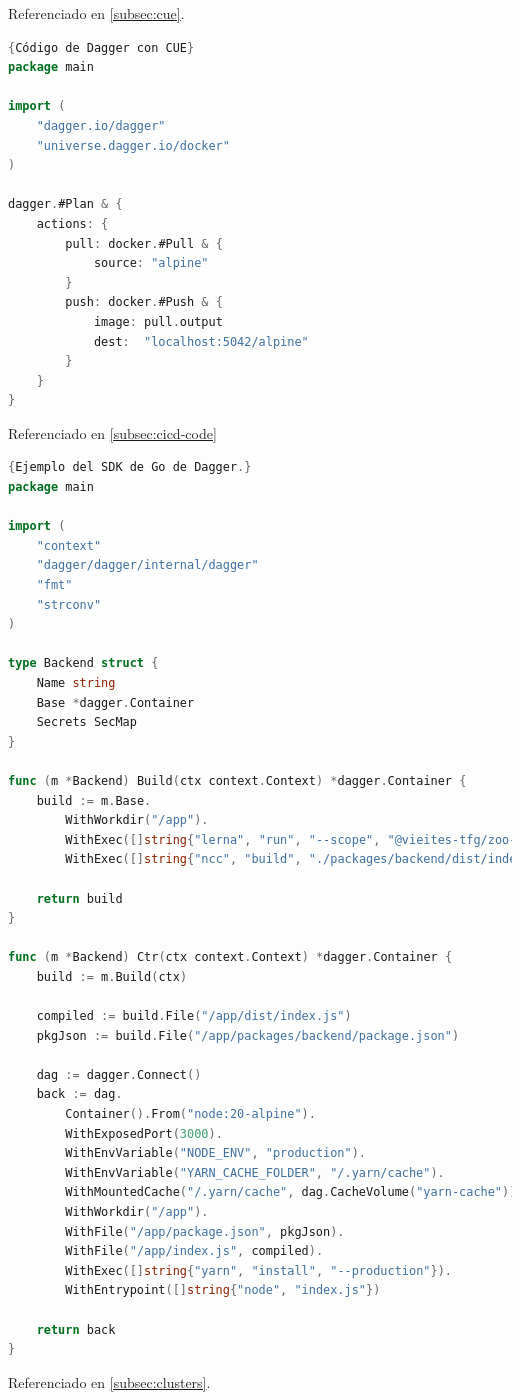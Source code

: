 Referenciado en \ref{subsec:cue}.

\begin{lstlisting}[language=go,label=lst:cue]{Código de Dagger con CUE}
package main

import (
    "dagger.io/dagger"
    "universe.dagger.io/docker"
)

dagger.#Plan & {
    actions: {
        pull: docker.#Pull & {
            source: "alpine"
        }
        push: docker.#Push & {
            image: pull.output
            dest:  "localhost:5042/alpine"
        }
    }
}
\end{lstlisting}

Referenciado en \ref{subsec:cicd-code}

\begin{lstlisting}[language=go,label=lst:daggergo]{Ejemplo del SDK de Go de Dagger.}
package main

import (
	"context"
	"dagger/dagger/internal/dagger"
	"fmt"
	"strconv"
)

type Backend struct {
	Name string
	Base *dagger.Container
	Secrets SecMap
}

func (m *Backend) Build(ctx context.Context) *dagger.Container {
	build := m.Base.
		WithWorkdir("/app").
		WithExec([]string{"lerna", "run", "--scope", "@vieites-tfg/zoo-backend", "build"}).
		WithExec([]string{"ncc", "build", "./packages/backend/dist/index.js", "-o", "./dist"})

	return build
}

func (m *Backend) Ctr(ctx context.Context) *dagger.Container {
	build := m.Build(ctx)

	compiled := build.File("/app/dist/index.js")
	pkgJson := build.File("/app/packages/backend/package.json")

	dag := dagger.Connect()
	back := dag.
		Container().From("node:20-alpine").
		WithExposedPort(3000).
		WithEnvVariable("NODE_ENV", "production").
		WithEnvVariable("YARN_CACHE_FOLDER", "/.yarn/cache").
		WithMountedCache("/.yarn/cache", dag.CacheVolume("yarn-cache")).
		WithWorkdir("/app").
		WithFile("/app/package.json", pkgJson).
		WithFile("/app/index.js", compiled).
		WithExec([]string{"yarn", "install", "--production"}).
		WithEntrypoint([]string{"node", "index.js"})

	return back
}
\end{lstlisting}

Referenciado en \ref{subsec:clusters}.

